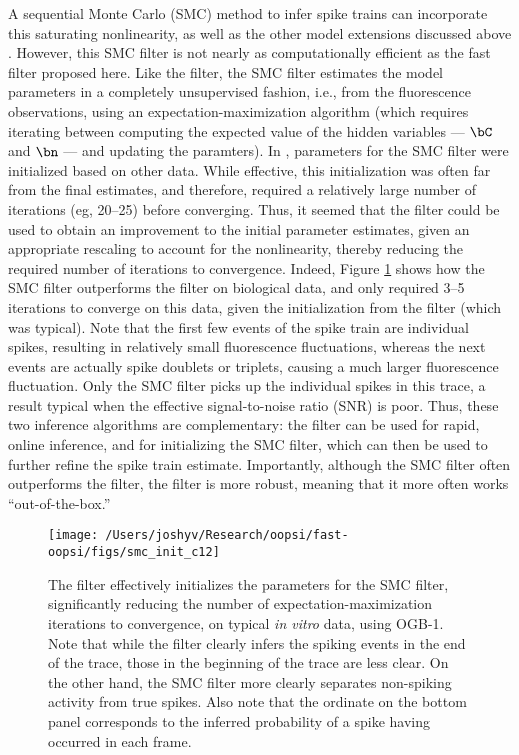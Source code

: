 A sequential Monte Carlo (SMC) method to infer spike trains can incorporate this saturating nonlinearity, as well as the other model extensions discussed above \cite{VogelsteinPaninski09} . However, this SMC filter is not nearly as computationally efficient as the fast filter proposed here.  Like the \foopsi filter, the SMC filter estimates the model parameters in a completely unsupervised fashion, i.e.,  from the fluorescence observations, using an expectation-maximization algorithm (which requires iterating between computing the expected value of the hidden variables --- $\bC$ and $\bn$ --- and updating the paramters).  In \cite{VogelsteinPaninski09}, parameters for the SMC filter were initialized based on other data.  While effective, this initialization was often far from the final estimates, and therefore, required a relatively large number of iterations (eg, 20--25) before converging.  Thus, it seemed that the \foopsi filter could be used to obtain an improvement to the initial parameter estimates, given an appropriate rescaling to account for the nonlinearity, thereby reducing the required number of iterations to convergence.  Indeed, Figure \ref{fig:smc_init} shows how the SMC filter outperforms the \foopsi filter on biological data, and only required 3--5 iterations to converge on this data, given the initialization from the \foopsi filter (which was typical).  Note that the first few events of the spike train are individual spikes, resulting in relatively small fluorescence fluctuations, whereas the next events are actually spike doublets or triplets, causing a much larger fluorescence fluctuation.  Only the SMC filter picks up the individual spikes in this trace, a result typical when the effective signal-to-noise ratio (SNR) is poor.  Thus, these two inference algorithms are complementary: the \foopsi filter can be used for rapid, online inference, and for initializing the SMC filter, which can then be used to further refine the spike train estimate.  Importantly, although the SMC filter often outperforms the \foopsi filter, the \foopsi filter is more robust, meaning that it more often works ``out-of-the-box.''

\begin{figure}[h!]
\centering \texttt{[image: /Users/joshyv/Research/oopsi/fast-oopsi/figs/smc\_init\_c12]}
\caption[\foopsi filter can initialize Wiener filter]{The \foopsi filter effectively initializes the parameters for the SMC filter, significantly reducing the number of expectation-maximization iterations to convergence, on typical \emph{in vitro} data, using OGB-1.  Note that while the \foopsi filter clearly infers the spiking events in the end of the trace, those in the beginning of the trace are less clear.  On the other hand, the SMC filter more clearly separates non-spiking activity from true spikes.  Also note that the ordinate on the bottom panel corresponds to the inferred probability of a spike having occurred in each frame.} \label{fig:smc_init}
\end{figure}

